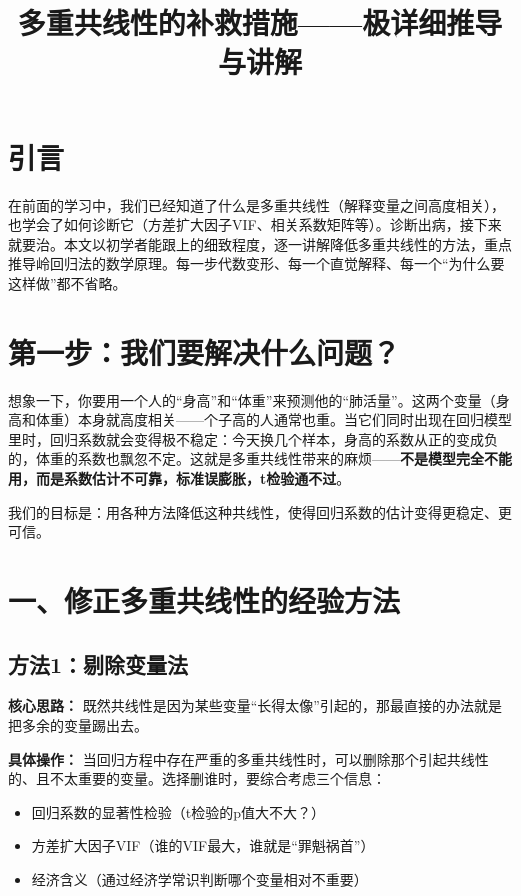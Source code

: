 \documentclass[12pt,a4paper]{ctexart}
\title{\bfseries 多重共线性的补救措施——极详细推导与讲解}
\author{}
\date{}
\begin{document}
\maketitle

\section*{引言}

在前面的学习中，我们已经知道了什么是多重共线性（解释变量之间高度相关），也学会了如何诊断它（方差扩大因子VIF、相关系数矩阵等）。诊断出病，接下来就要治。本文以初学者能跟上的细致程度，逐一讲解降低多重共线性的方法，重点推导岭回归法的数学原理。每一步代数变形、每一个直觉解释、每一个“为什么要这样做”都不省略。

\section*{第一步：我们要解决什么问题？}

想象一下，你要用一个人的“身高”和“体重”来预测他的“肺活量”。这两个变量（身高和体重）本身就高度相关——个子高的人通常也重。当它们同时出现在回归模型里时，回归系数就会变得极不稳定：今天换几个样本，身高的系数从正的变成负的，体重的系数也飘忽不定。这就是多重共线性带来的麻烦——\textbf{不是模型完全不能用，而是系数估计不可靠，标准误膨胀，t检验通不过}。

我们的目标是：用各种方法降低这种共线性，使得回归系数的估计变得更稳定、更可信。

\section{一、修正多重共线性的经验方法}

\subsection{方法1：剔除变量法}

\textbf{核心思路：} 既然共线性是因为某些变量“长得太像”引起的，那最直接的办法就是把多余的变量踢出去。

\textbf{具体操作：} 当回归方程中存在严重的多重共线性时，可以删除那个引起共线性的、且不太重要的变量。选择删谁时，要综合考虑三个信息：
\begin{itemize}
\item 回归系数的显著性检验（t检验的p值大不大？）
\item 方差扩大因子VIF（谁的VIF最大，谁就是“罪魁祸首”）
\item 经济含义（通过经济学常识判断哪个变量相对不重要）
\end{itemize}
\end{document}
